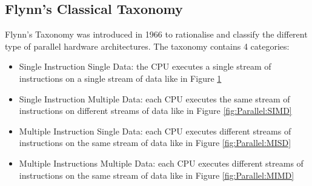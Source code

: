 \subsection{Flynn's Classical Taxonomy}
Flynn's Taxonomy was introduced in 1966 to rationalise and classify the
different type of parallel hardware architectures.
The taxonomy contains 4 categories:
\begin{itemize}
\item Single Instruction Single Data: the CPU executes a single stream of
instructions on a single stream of data like in Figure \ref{fig:Parallel:SISD}
\item Single Instruction Multiple Data: each CPU executes the same stream of
instructions on different streams of data like in Figure \ref{fig:Parallel:SIMD}
\item Multiple Instruction Single Data: each CPU executes different
streams of instructions on the same stream of data like in Figure \ref{fig:Parallel:MISD}
\item Multiple Instructions Multiple Data: each CPU executes different
streams of instructions on the same stream of data like in Figure \ref{fig:Parallel:MIMD}
\end{itemize}

\begin{figure}[htbp]
  \begin{center}
      \hspace{1pt}
    \caption[SISD architecture]{ \label{fig:Parallel:SISD}}
  \end{center}
\end{figure}

